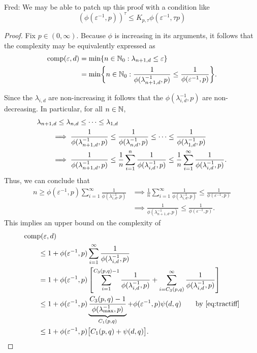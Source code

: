 \documentclass{article}
\theoremstyle{definition}
\newcommand{\fred}[1]{\begingroup\color{blue}Fred: #1\endgroup}
\begin{document}
\fred{We may be able to patch up this proof with a condition like $$(\phi(\varepsilon^{-1},p))^{\tau} \le K_{p,\tau} \phi (\varepsilon^{-1},\tau p)$$}
\begin{proof}
Fix $p \in (0,\infty)$.  Because $\phi$ is increasing in its arguments, it follows that the complexity may be equivalently expressed as 
\begin{align*}
    \operatorname{comp}(\varepsilon, d) &= \min \{n \in \mathbb{N}_{0} : \lambda_{n+1, d} \le \varepsilon\} \\
    &= \min \biggl\{n \in \mathbb{N}_{0} : \frac{1}{\phi(\lambda_{n+1, d}^{-1},p)} \le \frac{1}{\phi(\varepsilon^{-1},p)} \biggr\}.
\end{align*}

Since the $\lambda_{i,d}$ are non-increasing it follows that the $\phi(\lambda_{i, d}^{-1},p)$ are non-decreasing.  In particular, for all $n \in \mathbb{N}$,
\begin{align*}
    \MoveEqLeft{\lambda_{n+1,d} \le \lambda_{n,d} \le \cdots \le \lambda_{1,d}} \\
    & \implies \frac{1}{\phi(\lambda_{n+1, d}^{-1},p)} \le \frac{1}{\phi(\lambda_{n, d}^{-1},p)} \le \cdots \le \frac{1}{\phi(\lambda_{1, d}^{-1},p)} \\
    & \implies \frac{1}{\phi(\lambda_{n+1, d}^{-1},p)} 
    \le \frac 1n \sum_{i=1}^n  \frac{1}{\phi(\lambda_{i, d}^{-1},p)} 
    \le \frac 1n \sum_{i=1}^\infty  \frac{1}{\phi(\lambda_{i, d}^{-1},p)}.
\end{align*}
Thus, we can conclude that 
\begin{align*}
    n \ge \phi(\varepsilon^{-1},p) \sum_{i=1}^\infty \frac{1}{\phi(\lambda_{i, d}^{-1},p)}
    & \implies 
  \frac 1n \sum_{i=1}^\infty \frac{1}{\phi(\lambda_{i, d}^{-1},p)} \le  \frac{1}{\phi(\varepsilon^{-1},p)} \\
   & \implies   \frac{1}{\phi(\lambda_{n+1, d}^{-1},p)} \le \frac{1}{\phi(\varepsilon^{-1},p)}.
\end{align*}
This implies an upper bound on the complexity of
\begin{align*}
       \MoveEqLeft{\comp(\varepsilon,d)} \\
       &\le 1 + \phi(\varepsilon^{-1},p) \sum_{i=1}^\infty \frac{1}{\phi(\lambda_{i, d}^{-1},p)} \\
       & = 1 + \phi(\varepsilon^{-1},p) \left [ \sum_{i=1}^{C_3(p,q)-1} \frac{1}{\phi(\lambda_{i, d}^{-1},p)}  + \sum_{i=C_3(p,q)}^\infty \frac{1}{\phi(\lambda_{i, d}^{-1},p)} \right ] \\
       & \le 1+  \phi(\varepsilon^{-1},p) \underbrace{\frac{C_3(p,q)-1}{\phi(\lambda_{\max}^{-1},p)}}_{C_1(p,q)}
       +  \phi(\varepsilon^{-1},p) \psi(d,q) 
        \qquad \text{by \eqref{eq:tractiff}} \\
        & \le 1+  \phi(\varepsilon^{-1},p) \bigl[C_1(p,q) + \psi(d,q) \bigr].
\end{align*}


\end{proof}
\end{document}

